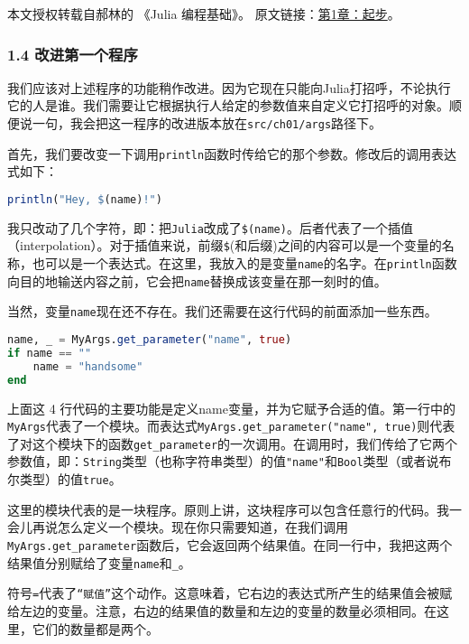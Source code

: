 
本文授权转载自郝林的 《Julia 编程基础》。 原文链接：\href{https://github.com/hyper0x/JuliaBasics/blob/master/book/ch01.md}{第1章：起步}。


\subsubsection{1.4 改进第一个程序}

我们应该对上述程序的功能稍作改进。因为它现在只能向Julia打招呼，不论执行它的人是谁。我们需要让它根据执行人给定的参数值来自定义它打招呼的对象。顺便说一句，我会把这一程序的改进版本放在\verb`src/ch01/args`路径下。

首先，我们要改变一下调用\verb`println`函数时传给它的那个参数。修改后的调用表达式如下：
\begin{lstlisting}[language=julia]
println("Hey, $(name)!")
\end{lstlisting}

我只改动了几个字符，即：把\verb`Julia`改成了\verb`$(name)`。后者代表了一个插值（interpolation）。对于插值来说，前缀\verb`$`(和后缀)之间的内容可以是一个变量的名称，也可以是一个表达式。在这里，我放入的是变量\verb`name`的名字。在\verb`println`函数向目的地输送内容之前，它会把\verb`name`替换成该变量在那一刻时的值。

当然，变量\verb`name`现在还不存在。我们还需要在这行代码的前面添加一些东西。

\begin{lstlisting}[language=julia]
name, _ = MyArgs.get_parameter("name", true)
if name == "" 
    name = "handsome" 
end
\end{lstlisting}

上面这 4 行代码的主要功能是定义name变量，并为它赋予合适的值。第一行中的\verb`MyArgs`代表了一个模块。而表达式\verb`MyArgs.get_parameter("name", true)`则代表了对这个模块下的函数\verb`get_parameter`的一次调用。在调用时，我们传给了它两个参数值，即：\verb`String`类型（也称字符串类型）的值\verb`"name"`和\verb`Bool`类型（或者说布尔类型）的值\verb`true`。

这里的模块代表的是一块程序。原则上讲，这块程序可以包含任意行的代码。我一会儿再说怎么定义一个模块。现在你只需要知道，在我们调用\verb`MyArgs.get_parameter`函数后，它会返回两个结果值。在同一行中，我把这两个结果值分别赋给了变量\verb`name`和\verb`_`。

符号\verb`=`代表了\verb`“赋值”`这个动作。这意味着，它右边的表达式所产生的结果值会被赋给左边的变量。注意，右边的结果值的数量和左边的变量的数量必须相同。在这里，它们的数量都是两个。

